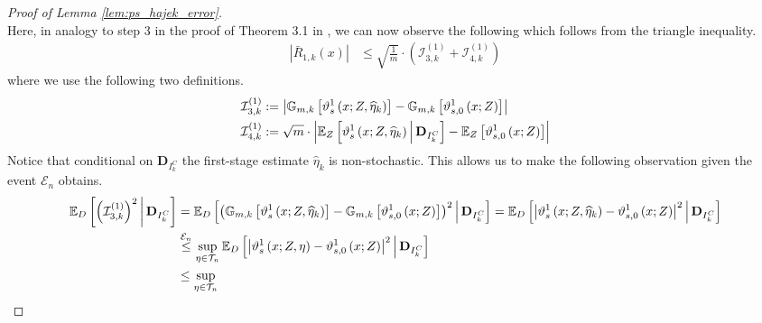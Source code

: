 \begin{proof}[Proof of Lemma \ref{lem:ps_hajek_error}]
\begin{equation}
    \end{equation}
    Here, in analogy to step 3 in the proof of Theorem 3.1 in \citet{chernozhukov_doubledebiased_2018}, we can now observe the following which follows from the triangle inequality.
    \begin{equation}
        \begin{aligned}
            \left|\bar{R}_{1, k}\left(x\right)\right|
            & \leq \sqrt{\frac{1}{m}} \cdot \left(\mathcal{I}_{3,k}^{(1)} + \mathcal{I}_{4,k}^{(1)}\right)
        \end{aligned}
    \end{equation}
    where we use the following two definitions.
    \begin{align}
        \mathcal{I}_{3,k}^{(1)} 
        & := \left|\mathbb{G}_{m,k}\left[\vartheta_{s}^{1}\left(x; Z, \widehat{\eta}_{k}\right)\right] 
        - \mathbb{G}_{m,k}\left[\vartheta_{s,0}^{1}\left(x; Z\right) \right]\right|\\
        \mathcal{I}_{4,k}^{(1)} 
        & := \sqrt{m} \cdot \left|
        \mathbb{E}_{Z}\left[\vartheta_{s}^{1}\left(x; Z, \widehat{\eta}_{k}\right) \, \middle| \, \mathbf{D}_{I_{k}^{C}}\right]
        - \mathbb{E}_{Z}\left[\vartheta_{s,0}^{1}\left(x; Z\right) \right]\right|
    \end{align}
    Notice that conditional on $\mathbf{D}_{I_{k}^{C}}$ the first-stage estimate $\hat{\eta}_{k}$ is non-stochastic.
    This allows us to make the following observation given the event $\mathcal{E}_{n}$ obtains.
    \begin{equation}
        \begin{aligned}
            \E_{D}\left[\left(\mathcal{I}_{3,k}^{(1)}\right)^{2} \, \middle| \, \mathbf{D}_{I_{k}^{C}}\right] 
            & = \E_{D}\left[ \left(\mathbb{G}_{m,k}\left[\vartheta_{s}^{1}\left(x; Z, \hat{\eta}_{k}\right)\right] 
            - \mathbb{G}_{m,k}\left[\vartheta_{s,0}^{1}\left(x; Z\right)\right]\right)^{2} \, \middle| \, \mathbf{D}_{I_{k}^{C}}\right]
            = \E_{D}\left[\left|\vartheta_{s}^{1}\left(x; Z, \hat{\eta}_{k}\right) - \vartheta_{s,0}^{1}\left(x; Z\right)\right|^{2}
            \, \middle| \, \mathbf{D}_{I_{k}^{C}}\right]\\
            & \overset{\mathcal{E}_{n}}{\leq} \sup_{\eta \in \mathcal{T}_{n}} 
             \E_{D}\left[\left|\vartheta_{s}^{1}\left(x; Z, \eta\right) - \vartheta_{s,0}^{1}\left(x; Z\right)\right|^{2}
            \, \middle| \, \mathbf{D}_{I_{k}^{C}}\right]\\
            & \leq \sup_{\eta \in \mathcal{T}_{n}} 

\end{aligned}
\end{equation}
\end{proof}
